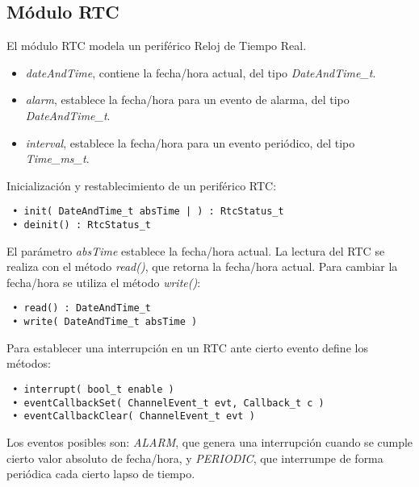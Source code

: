 \subsection{Módulo RTC}

El módulo RTC modela un periférico Reloj de Tiempo Real.


\begin{itemize}
\item
\emph{dateAndTime}, contiene la fecha/hora actual, del tipo \emph{DateAndTime\_t}.
\item
\emph{alarm}, establece la fecha/hora para un evento de alarma, del tipo \emph{DateAndTime\_t}.
\item
\emph{interval}, establece la fecha/hora para un evento periódico, del tipo \emph{Time\_ms\_t}.
\end{itemize}


Inicialización y restablecimiento de un periférico RTC:

\begin{verbatim}
 • init( DateAndTime_t absTime | ) : RtcStatus_t
 • deinit() : RtcStatus_t
\end{verbatim}

El parámetro \emph{absTime} establece la fecha/hora actual. La lectura del RTC se realiza con el método \emph{read()}, que retorna la fecha/hora actual. Para cambiar la fecha/hora se utiliza el método \emph{write()}:

\begin{verbatim}
 • read() : DateAndTime_t
 • write( DateAndTime_t absTime )
\end{verbatim}

Para establecer una interrupción en un RTC ante cierto evento define los métodos: 

\begin{verbatim}
 • interrupt( bool_t enable )
 • eventCallbackSet( ChannelEvent_t evt, Callback_t c )
 • eventCallbackClear( ChannelEvent_t evt )
\end{verbatim}

Los eventos posibles son: \emph{ALARM}, que genera una interrupción cuando se cumple cierto valor absoluto de fecha/hora, y \emph{PERIODIC}, que interrumpe de forma periódica cada cierto lapso de tiempo.
